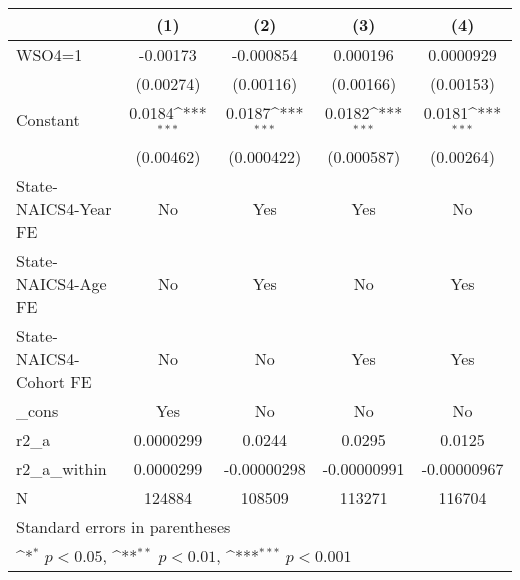 {
\def\sym#1{\ifmmode^{#1}\else\(^{#1}\)\fi}
\begin{tabular}{l*{4}{c}}
\hline\hline
                    &\multicolumn{1}{c}{(1)}         &\multicolumn{1}{c}{(2)}         &\multicolumn{1}{c}{(3)}         &\multicolumn{1}{c}{(4)}         \\
\hline
WSO4=1              &    -0.00173         &   -0.000854         &    0.000196         &   0.0000929         \\
                    &   (0.00274)         &   (0.00116)         &   (0.00166)         &   (0.00153)         \\
[1em]
Constant            &      0.0184\sym{***}&      0.0187\sym{***}&      0.0182\sym{***}&      0.0181\sym{***}\\
                    &   (0.00462)         &  (0.000422)         &  (0.000587)         &   (0.00264)         \\
[1em]
State-NAICS4-Year FE&          No         &         Yes         &         Yes         &          No         \\
[1em]
State-NAICS4-Age FE &          No         &         Yes         &          No         &         Yes         \\
[1em]
State-NAICS4-Cohort FE&          No         &          No         &         Yes         &         Yes         \\
[1em]
\_cons              &         Yes         &          No         &          No         &          No         \\
\hline
r2\_a                &   0.0000299         &      0.0244         &      0.0295         &      0.0125         \\
r2\_a\_within         &   0.0000299         & -0.00000298         & -0.00000991         & -0.00000967         \\
N                   &      124884         &      108509         &      113271         &      116704         \\
\hline\hline
\multicolumn{5}{l}{\footnotesize Standard errors in parentheses}\\
\multicolumn{5}{l}{\footnotesize \sym{*} \(p<0.05\), \sym{**} \(p<0.01\), \sym{***} \(p<0.001\)}\\
\end{tabular}
}

